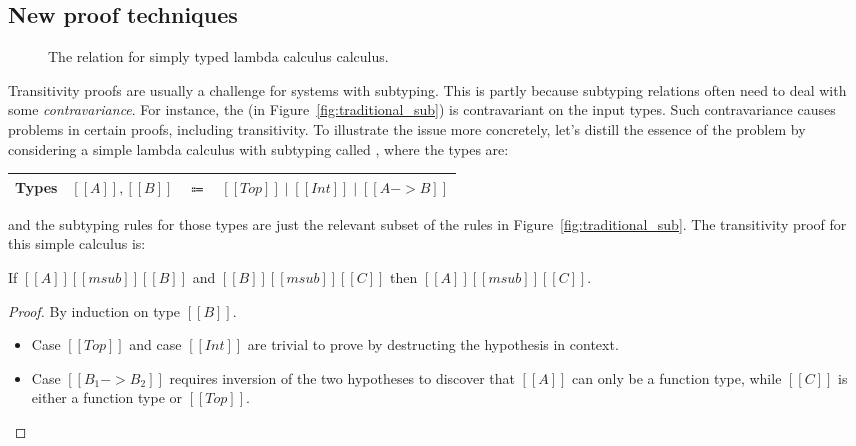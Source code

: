 \subsection{New proof techniques}
\label{sec:overview:5}

\begin{figure}[t]
  \begin{small}
    \centering
  \end{small}
  \caption{The \nameduo relation for simply typed lambda calculus calculus.}
  \label{fig:subtyping1}
\end{figure}

\noindent Transitivity proofs are usually a challenge for systems with
subtyping. This is partly because subtyping relations often need to
deal with some \emph{contravariance}. For instance, the
 (in Figure~\ref{fig:traditional_sub}) is contravariant on the input
types. Such contravariance causes problems in certain proofs,
including transitivity. To illustrate the issue more concretely,
let's distill the essence of the problem by considering a
simple lambda calculus with subtyping called \stlc, where the types are:


\begin{center}
\begin{tabular}{lrcl} \toprule
  Types & $[[A]], [[B]]$ & $\Coloneqq$ & $ [[Top]] \mid [[Int]] \mid [[A -> B]] $ \\
  \bottomrule
\end{tabular}
\end{center}

\noindent and the subtyping rules for those types are just the
relevant subset of the rules in Figure~\ref{fig:traditional_sub}.
The transitivity proof for this simple calculus is: 

\begin{lemma}
\label{stlc:trasn1}
   If $[[A]] [[msub]] [[B]]$ and $[[B]] [[msub]] [[C]]$ then $[[A]] [[msub]] [[C]]$.
\end{lemma}
 
\begin{proof}
By induction on type $[[B]]$. 
\begin{itemize}
  \item{Case $[[Top]]$ and case $[[Int]]$ are trivial to prove by destructing the hypothesis in context.}
  \item{Case $[[B_1 -> B_2]]$ requires inversion of the two hypotheses to discover that $[[A]]$ can only be
        a function type, while $[[C]]$ is either a function type or $[[Top]]$.}
\end{itemize}
\end{proof}

